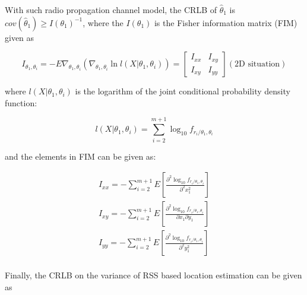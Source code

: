 \documentclass[12pt]{report}
\begin{document}
With such radio propagation channel model, the CRLB of $\hat{\theta}_1$ is $cov(\hat{\theta}_1) \geq I(\theta_1)^{-1}$, where the $I(\theta_1)$ is the Fisher information matrix (FIM) given as~\cite{lzc}~\cite{yin}~\cite{che02}

\begin{equation}
I_{\theta_1, \theta_i} = -E\nabla_{\theta_1, \theta_i}(\nabla_{\theta_1, \theta_i} \ln l (X|\theta_1,\theta_i)) = 
\begin{bmatrix}
I_{xx} & I_{xy} \\
I_{xy} & I_{yy}
\end{bmatrix}
(\textrm{2D situation})
\end{equation}

where $l(X|\theta_1,\theta_i)$ is the logarithm of the joint conditional probability density function:

\begin{equation}
l(X|\theta_1,\theta_i) = \sum^{m+1}_{i = 2} \log_{10} f_{r_i/ \theta_1,\theta_i}
\end{equation}

and the elements in FIM can be given as:

\begin{equation}
\begin{matrix}
I_{xx} = -\sum^{m+1}_{i=2} E[\frac{\partial^2 \log_{10} f_{r_i/ \theta_1,\theta_i} }{\partial^2 x^2_1}] \\
I_{xy} = -\sum^{m+1}_{i=2} E[\frac{\partial^2 \log_{10} f_{r_i/ \theta_1,\theta_i} }{\partial x_1 \partial y_1}] \\
I_{yy} = -\sum^{m+1}_{i=2} E[\frac{\partial^2 \log_{10} f_{r_i/ \theta_1,\theta_i} }{\partial^2 y^2_1}] \\
\end{matrix}
\end{equation}

Finally, the CRLB on the variance of RSS based location estimation can be given as
\end{document}
